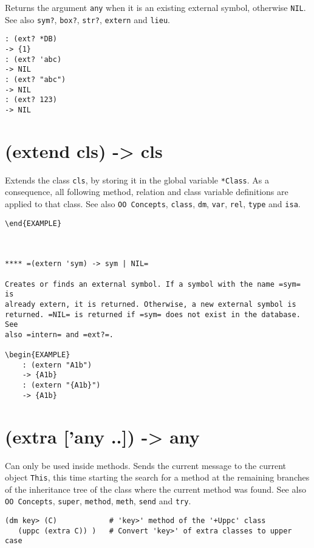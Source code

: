 {{{{{Returns the argument \texttt{any} when it is an existing external symbol,
otherwise \texttt{NIL}. See also \texttt{sym?}, \texttt{box?}, \texttt{str?}, \texttt{extern} and \texttt{lieu}.


\begin{verbatim}
: (ext? *DB)
-> {1}
: (ext? 'abc)
-> NIL
: (ext? "abc")
-> NIL
: (ext? 123)
-> NIL
\end{verbatim}

 
\section{(extend cls) -> cls}
\label{sec-8-1-5-19}


Extends the class \texttt{cls}, by storing it in the global variable \texttt{*Class}.
As a consequence, all following method, relation and class variable
definitions are applied to that class. See also \texttt{OO Concepts}, \texttt{class},
\texttt{dm}, \texttt{var}, \texttt{rel}, \texttt{type} and \texttt{isa}.


\begin{verbatim}
\end{EXAMPLE}

 

**** =(extern 'sym) -> sym | NIL=

Creates or finds an external symbol. If a symbol with the name =sym= is
already extern, it is returned. Otherwise, a new external symbol is
returned. =NIL= is returned if =sym= does not exist in the database. See
also =intern= and =ext?=.

\begin{EXAMPLE}
    : (extern "A1b")
    -> {A1b}
    : (extern "{A1b}")
    -> {A1b}
\end{verbatim}

 
\section{(extra ['any ..]) -> any}
\label{sec-8-1-5-20}


Can only be used inside methods. Sends the current message to the
current object \texttt{This}, this time starting the search for a method at the
remaining branches of the inheritance tree of the class where the
current method was found. See also \texttt{OO Concepts}, \texttt{super}, \texttt{method},
\texttt{meth}, \texttt{send} and \texttt{try}.


\begin{verbatim}
(dm key> (C)            # 'key>' method of the '+Uppc' class
   (uppc (extra C)) )   # Convert 'key>' of extra classes to upper case
\end{verbatim}

}}}}}
